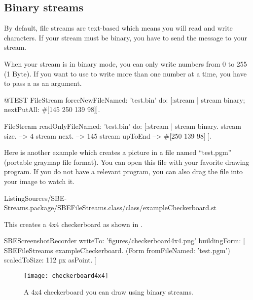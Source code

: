 \documentclass[a4paper,10pt,twoside]{book}
\begin{document}
\subsection{Binary streams}
\label{sec:binary-streams}

By default, file streams are text-based which means you will read and write characters.
If your stream must be binary, you have to send the message  to your stream.

When your stream is in binary mode, you can only write numbers from 0 to 255 (1 Byte).
If you want to use  to write more than one number at a time, you have to pass a  as an argument.

\begin{code}{@TEST}
FileStream
  forceNewFileNamed: 'test.bin'
  do: [:stream |
          stream
            binary;
            nextPutAll: #[145 250 139 98]].

FileStream
  readOnlyFileNamed: 'test.bin'
  do: [:stream |
          stream binary.
          stream size.         --> 4
          stream next.         --> 145
          stream upToEnd --> #[250 139 98]
   		].
\end{code}

Here is another example which creates a picture in a file named ``test.pgm'' (portable graymap file format).
You can open this file with your favorite drawing program.
If you do not have a relevant program, you can also drag the file into your \sq image to watch it.

%
{ListingSources/SBE-Streams.package/SBEFileStreams.class/class/exampleCheckerboard.st}

This creates a 4x4 checkerboard as shown in .

\begin{ExecuteSmalltalkScript}
SBEScreenshotRecorder writeTo: 'figures/checkerboard4x4.png' buildingForm: [
	SBEFileStreams exampleCheckerboard.
	(Form fromFileNamed: 'test.pgm') scaledToSize: 112 px asPoint.
]
\end{ExecuteSmalltalkScript}
\begin{figure}[!ht]
\centerline{\texttt{[image: checkerboard4x4]}}
\caption{A 4x4 checkerboard you can draw using binary streams.}
\label{fig:checkerboard4x4}
\vspace{.2in}
\end{figure}
\end{document}
